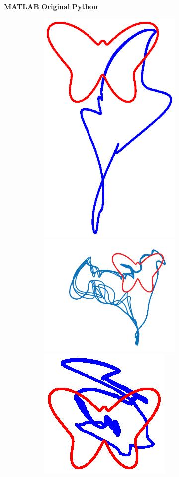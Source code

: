 
\begin{figure}

    \centering
    \textbf{MATLAB}\hspace{8em}
    \textbf{Original}\hspace{8em}
    \textbf{Python}
    

    \begin{subfigure}{\textwidth}
        \centering
        
        \textbf{}\begin{subfigure}{\textwidth}
        \centering
        
        \hspace{-3em}
        \includegraphics[trim=3cm 0cm 3cm 4cm, clip=true,height=.25\linewidth]{Figures/Fig_T3/MATLAB/RMHL_T2_Seg2_Trajectory.eps}
        \hspace{2em}
        \includegraphics[trim=1cm 0cm 0cm 0cm, clip=true,height=.25\linewidth]{Figures/Fig_T3/Orig/RMHL_T2_Trajectory.png}
        \hspace{3em}
        \includegraphics[trim=6cm 1.25cm 6cm 4.25cm, clip=true,height=.25\linewidth]{Figures/Fig_T3/Python/RMHL_T2_Seg2_Trajectory.eps}
        
        \end{subfigure}
         
        
        \textbf{}\begin{subfigure}{\textwidth}
        \centering
        

\end{subfigure}
\end{subfigure}
\end{figure}
